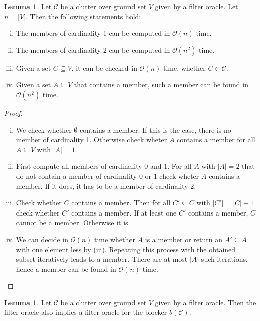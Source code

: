 \documentclass[a4paper, 12pt]{scrbook}
\theoremstyle{definition}
\newtheorem{lemma}[theorem]{Lemma}
\begin{document}
   \begin{lemma}\label{computations}
       Let $\mathcal{C}$ be a clutter over ground set $V$ given by a filter oracle.
       Let $n=|V|$.
       Then the following statements hold:
       \begin{enumerate}[(i)]
           \item The members of cardinality 1 can be computed in $\mathcal{O}(n)$ time.
           \item The members of cardinality 2 can be computed in $\mathcal{O}(n^2)$ time.
           \item Given a set $C \subseteq V$, it can be checked in $\mathcal{O}(n)$ time, whether $C \in \mathcal{C}$.
           \item Given a set $A \subseteq V$ that contains a member, such a member can be found in $\mathcal{O}(n^2)$ time.
       \end{enumerate}
   \end{lemma}
   \begin{proof}
       \leavevmode
       \begin{enumerate}[(i)]
           \item We check whether $\emptyset$ contains a member. If this is the case, there is no member of cardinality 1. Otherwise check wheter $A$ contains a member for all $A \subseteq V$ with $|A|=1$.
           \item First compute all members of cardinality 0 and 1. For all $A$ with $|A|=2$ that do not contain a member of cardinality 0 or 1 check wheter $A$ contains a member. If it does, it has to be a member of cardinality 2.
           \item Check whether $C$ contains a member. Then for all $C' \subseteq C$ with $|C'|=|C|-1$ check whether $C'$ contains a member. If at least one $C'$ contains a member, $C$ cannot be a member. Otherwise it is.
           \item We can decide in $\mathcal{O}(n)$ time whether $A$ is a member or return an $A' \subseteq A$ with one element less by (iii). Repeating this process with the obtained subset iteratively leads to a member. There are at most $|A|$ such iterations, hence a member can be found in $\mathcal{O}(n)$ time.
       \end{enumerate}

   \end{proof}

   \begin{lemma}
       Let $\mathcal{C}$ be a clutter over ground set $V$ given by a filter oracle.
       Then the filter oracle also implies a filter oracle for the blocker $b(\mathcal{C})$.
   \end{lemma}
\end{document}
